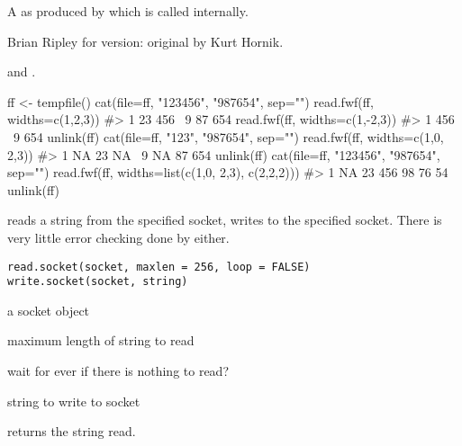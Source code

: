 %
\begin{Value}
A  as produced by 
which is called internally.
\end{Value}
%
\begin{Author}\relax
Brian Ripley for \R{} version: original  by Kurt Hornik.
\end{Author}
%
\begin{SeeAlso}\relax
{} and .
\end{SeeAlso}
%
\begin{Examples}
\begin{ExampleCode}
ff <- tempfile()
cat(file=ff, "123456", "987654", sep="\n")
read.fwf(ff, widths=c(1,2,3))    #> 1 23 456 \ 9 87 654
read.fwf(ff, widths=c(1,-2,3))   #> 1 456 \ 9 654
unlink(ff)
cat(file=ff, "123", "987654", sep="\n")
read.fwf(ff, widths=c(1,0, 2,3))    #> 1 NA 23 NA \ 9 NA 87 654
unlink(ff)
cat(file=ff, "123456", "987654", sep="\n")
read.fwf(ff, widths=list(c(1,0, 2,3), c(2,2,2))) #> 1 NA 23 456 98 76 54
unlink(ff)
\end{ExampleCode}
\end{Examples}
%
\begin{Description}\relax
{} reads a string from the specified socket,
 writes to the specified socket.  There is very
little error checking done by either.
\end{Description}
%
\begin{Usage}
\begin{verbatim}
read.socket(socket, maxlen = 256, loop = FALSE)
write.socket(socket, string)
\end{verbatim}
\end{Usage}
%
\begin{Arguments}
\begin{ldescription}
\item[\code{socket}] a socket object
\item[\code{maxlen}] maximum length of string to read
\item[\code{loop}] wait for ever if there is nothing to read?
\item[\code{string}] string to write to socket
\end{ldescription}
\end{Arguments}
%
\begin{Value}
 returns the string read.
\end{Value}
